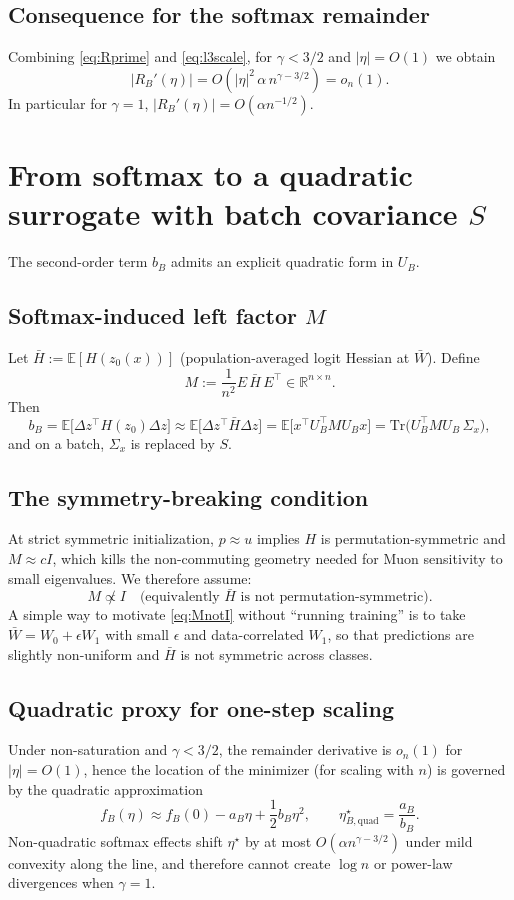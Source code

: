 \documentclass[11pt]{article}
\begin{document}
\subsection{Consequence for the softmax remainder}
Combining \eqref{eq:Rprime} and \eqref{eq:l3scale}, for $\gamma<3/2$ and $|\eta|=O(1)$ we obtain
\[
|R_B'(\eta)| = O\!\left(|\eta|^2\,\alpha\,n^{\gamma-3/2}\right)=o_n(1).
\]
In particular for $\gamma=1$, $|R_B'(\eta)|=O(\alpha n^{-1/2})$.

\section{From softmax to a quadratic surrogate with batch covariance $S$}

The second-order term $b_B$ admits an explicit quadratic form in $U_B$.

\subsection{Softmax-induced left factor $M$}
Let $\bar H:=\mathbb{E}[H(z_0(x))]$ (population-averaged logit Hessian at $\bar W$).
Define
\[
M := \frac{1}{n^2}E\,\bar H\,E^\top \in\mathbb{R}^{n\times n}.
\]
Then
\[
b_B = \mathbb{E}\big[\Delta z^\top H(z_0)\Delta z\big]
\approx \mathbb{E}\big[\Delta z^\top \bar H \Delta z\big]
= \mathbb{E}\big[x^\top U_B^\top M U_B x\big]
= \mathrm{Tr}\!\big(U_B^\top M U_B\,\Sigma_x\big),
\]
and on a batch, $\Sigma_x$ is replaced by $S$.

\subsection{The symmetry-breaking condition}
At strict symmetric initialization, $p\approx u$ implies $H$ is permutation-symmetric and $M\approx cI$, which kills the
non-commuting geometry needed for Muon sensitivity to small eigenvalues.
We therefore assume:
\begin{equation}
\label{eq:MnotI}
M \not\propto I
\quad\text{(equivalently $\bar H$ is not permutation-symmetric).}
\end{equation}
A simple way to motivate \eqref{eq:MnotI} without ``running training'' is to take $\bar W=W_0+\epsilon W_1$ with small $\epsilon$
and data-correlated $W_1$, so that predictions are slightly non-uniform and $\bar H$ is not symmetric across classes.

\subsection{Quadratic proxy for one-step scaling}
Under non-saturation and $\gamma<3/2$, the remainder derivative is $o_n(1)$ for $|\eta|=O(1)$, hence
the location of the minimizer (for scaling with $n$) is governed by the quadratic approximation
\[
f_B(\eta) \approx f_B(0) - a_B \eta + \frac12 b_B \eta^2,
\qquad \eta^\star_{B,\mathrm{quad}}=\frac{a_B}{b_B}.
\]
Non-quadratic softmax effects shift $\eta^\star$ by at most $O(\alpha n^{\gamma-3/2})$ under mild convexity along the line,
and therefore cannot create $\log n$ or power-law divergences when $\gamma=1$.
\end{document}
